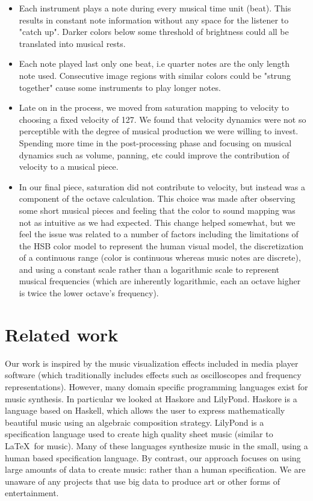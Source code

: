 \documentclass[10pt, conference, compsocconf]{IEEEtran}
\begin{document}
\begin{itemize}

\item Each instrument plays a note during every musical time unit
  (beat). This results in constant note information without any space
  for the listener to "catch up".  Darker colors below some threshold
  of brightness could all be translated into musical rests.

\item Each note played last only one beat, i.e quarter notes are the
  only length note used.  Consecutive image regions with similar
  colors could be "strung together" cause some instruments to play
  longer notes.

\item Late on in the process, we moved from saturation mapping to
  velocity to choosing a fixed velocity of 127.  We found that
  velocity dynamics were not so perceptible with the degree of musical
  production we were willing to invest.  Spending more time in the
  post-processing phase and focusing on musical dynamics such as
  volume, panning, etc could improve the contribution of velocity to a
  musical piece.

\item In our final piece, saturation did not contribute to velocity,
  but instead was a component of the octave calculation. This choice
  was made after observing some short musical pieces and feeling that
  the color to sound mapping was not as intuitive as we had expected.
  This change helped somewhat, but we feel the issue was related to a
  number of factors including the limitations of the HSB color model
  to represent the human visual model, the discretization of a
  continuous range (color is continuous whereas music notes are
  discrete), and using a constant scale rather than a logarithmic
  scale to represent musical frequencies (which are inherently
  logarithmic, each an octave higher is twice the lower octave's
  frequency).

\end{itemize}

\section{Related work}

Our work is inspired by the music visualization effects included in
media player software (which traditionally includes effects such as
oscilloscopes and frequency representations).  However, many domain
specific programming languages exist for music synthesis.  In
particular we looked at Haskore \cite{haskore} and
LilyPond\cite{lilypond}.  Haskore is a language based on Haskell,
which allows the user to express mathematically beautiful music using
an algebraic composition strategy.  LilyPond is a specification
language used to create high quality sheet music (similar to \LaTeX\ 
for music).  Many of these languages synthesize music in the small,
using a human based specification language.  By contrast, our approach
focuses on using large amounts of data to create music: rather than a
human specification.  We are unaware of any projects that use big data
to produce art or other forms of entertainment.
\end{document}
